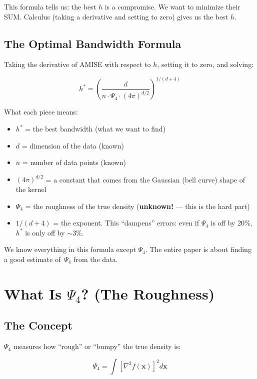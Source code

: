 \documentclass[12pt]{article}
\newcommand{\whythis}[1]{\begin{tcolorbox}[colback=orange!5,colframe=orange!50!black,title=Why do we need this?]\small #1\end{tcolorbox}}
\newcommand{\step}[1]{\begin{tcolorbox}[colback=blue!5,colframe=blue!50!black,title=Step-by-Step]\small #1\end{tcolorbox}}
\begin{document}
\whythis{This formula tells us: the best $h$ is a compromise. We want to minimize their SUM. Calculus (taking a derivative and setting to zero) gives us the best $h$.}

\subsection{The Optimal Bandwidth Formula}

Taking the derivative of AMISE with respect to $h$, setting it to zero, and solving:

$$h^* = \left(\frac{d}{n \cdot \Psi_4 \cdot (4\pi)^{d/2}}\right)^{1/(d+4)}$$

\step{
What each piece means:
\begin{itemize}
\item $h^*$ = the best bandwidth (what we want to find)
\item $d$ = dimension of the data (known)
\item $n$ = number of data points (known)
\item $(4\pi)^{d/2}$ = a constant that comes from the Gaussian (bell curve) shape of the kernel
\item $\Psi_4$ = the roughness of the true density (\textbf{unknown!} --- this is the hard part)
\item $1/(d+4)$ = the exponent. This ``dampens'' errors: even if $\Psi_4$ is off by 20\%, $h^*$ is only off by $\sim$3\%.
\end{itemize}
}

\whythis{We know everything in this formula except $\Psi_4$. The entire paper is about finding a good estimate of~$\Psi_4$ from the data.}

\section{What Is $\Psi_4$? (The Roughness)}

\subsection{The Concept}

$\Psi_4$ measures how ``rough'' or ``bumpy'' the true density is:

$$\Psi_4 = \int \left[\nabla^2 f(\mathbf{x})\right]^2 d\mathbf{x}$$
\end{document}
